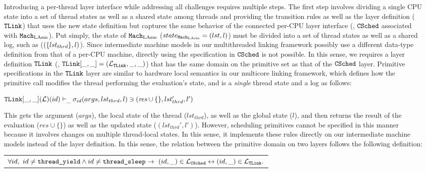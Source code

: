 Introducing a per-thread layer interface while addressing all challenges requires multiple steps. 
The first step involves dividing 
 a single CPU state into a set of thread states as well as a shared state among threads
and providing 
the transition rules as well as the layer definition (${{\mathrm{\texttt{TLink}}}}$) that uses the new state definition but captures 
the same behavior of the connected per-CPU layer interface (\ie, ${{\mathrm{\texttt{CSched}}}}$ associated with ${\mathrm{\texttt{Mach}}}_{\mathrm{LAsm}}$).
Put simply, the state of ${\mathrm{\texttt{Mach}}}_{\mathrm{LAsm}}$ ($state_{{\mathrm{\texttt{Mach}}}_{\mathrm{LAsm}}} = (lst, l)$) 
must be divided into a set of thread states as well as a shared log, such as  ($(\{lst_{thrd}\}, l)$).
Since intermediate machine models in our multithreaded linking framework possibly use a different data-type definition from that of a per-CPU machine, 
directly using the specification in  ${{\mathrm{\texttt{CSched}}}}$ is not possible. 
In this sense, 
we requires a layer definition ${{\mathrm{\texttt{TLink}}}}$ (\ie, ${{\mathrm{\texttt{TLink}}}}[\_, \_] = (\mathcal{L}_{{{\mathrm{\texttt{TLink}}}}}, \_, \_)$) that has the same domain on the primitive set as that of the ${{\mathrm{\texttt{CSched}}}}$ layer.
Primitive specifications in the ${{\mathrm{\texttt{TLink}}}}$ layer are similar to hardware local semantics in our multicore linking framework,
which defines how the primitive call modifies the thread performing the evaluation’s state, and is a \textit{single} thread state and a log as follows:
\begin{center}
${{\mathrm{\texttt{TLink}}}}[\_, \_](\mathcal{L})(id)
 \vdash_{\_}  \sigma_{id}(args, lst_{thrd}, l) \ni (\textit{res}\cup \{\}, lst_{thrd}', l')$
\end{center}
This gets the argument  ($args$), the local state of the thread ($lst_{thrd}$), as well as  the global state ($l$), and then 
returns the result of the evaluation ($\textit{res}\cup \{\}$) as well as the updated state ($(lst_{thrd}', l')$).
However, scheduling primitives cannot be specified in this manner because it involves changes on multiple thread-local states. 
 In this sense, it implements these rules directly on our intermediate machine models instead of the layer definition. 
 In this sense, the relation between the primitive domain on two layers follows the following definition:

%

\begin{definition}
\label{definition:chapter:conlink:same-domain-sched-tlink}
\begin{tabular}{P{0.95\textwidth}}
$\forall id,\ id \neq {\mathrm{\texttt{thread\_yield}}} \wedge id \neq {\mathrm{\texttt{thread\_sleep}}} \rightarrow 
 \ (id, \_) \in \mathcal{L}_{{{\mathrm{\texttt{CSched}}}}} \leftrightarrow (id, \_) \in  \mathcal{L}_{{{\mathrm{\texttt{TLink}}}}}.$\\
\end{tabular}
\end{definition}


